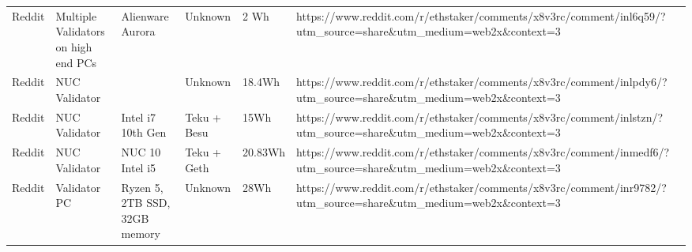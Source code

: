 \begin{landscape}
\begin{table}[]
\begin{tabular}{@{}llllll@{}}
Reddit                                                                               & Multiple Validators on high end PCs                                               & Alienware Aurora                                                                           & Unknown                                                                              & 2 Wh                                                                                        & https://www.reddit.com/r/ethstaker/comments/x8v3rc/comment/inl6q59/?utm\_source=share\&utm\_medium=web2x\&context=3 \\
Reddit                                                                               & NUC Validator                                                                     &                                                                                            & Unknown                                                                              & 18.4Wh                                                                                      & https://www.reddit.com/r/ethstaker/comments/x8v3rc/comment/inlpdy6/?utm\_source=share\&utm\_medium=web2x\&context=3 \\
Reddit                                                                               & NUC Validator                                                                     & Intel i7 10th Gen                                                                          & Teku + Besu                                                                          & 15Wh                                                                                        & https://www.reddit.com/r/ethstaker/comments/x8v3rc/comment/inlstzn/?utm\_source=share\&utm\_medium=web2x\&context=3 \\
Reddit                                                                               & NUC Validator                                                                     & NUC 10 Intel i5                                                                            & Teku + Geth                                                                          & 20.83Wh                                                                                     & https://www.reddit.com/r/ethstaker/comments/x8v3rc/comment/inmedf6/?utm\_source=share\&utm\_medium=web2x\&context=3 \\
Reddit                                                                               & Validator PC                                                                      & Ryzen 5, 2TB SSD, 32GB memory                                                              & Unknown                                                                              & 28Wh                                                                                        & https://www.reddit.com/r/ethstaker/comments/x8v3rc/comment/inr9782/?utm\_source=share\&utm\_medium=web2x\&context=3 \\

\end{tabular}
\end{table}
\end{landscape}
